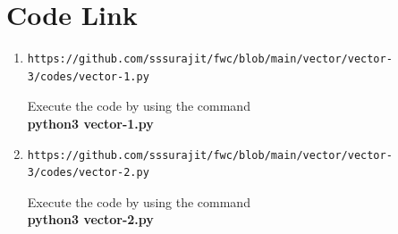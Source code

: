 \documentclass[journal,12pt,twocolumn]{IEEEtran}
\begin{document}
\section{\textbf{Code Link}}
\begin{enumerate}[label=(\roman*)]
\item 
\begin{lstlisting}
https://github.com/sssurajit/fwc/blob/main/vector/vector-3/codes/vector-1.py
\end{lstlisting}
Execute the code by using the command\\
\textbf{python3 vector-1.py}\\
\item
\begin{lstlisting}
https://github.com/sssurajit/fwc/blob/main/vector/vector-3/codes/vector-2.py
\end{lstlisting}
Execute the code by using the command\\
\textbf{python3 vector-2.py}\\
\end{enumerate}
\end{document}
